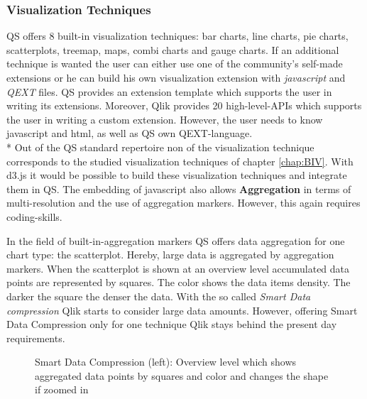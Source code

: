 \subsubsection*{Visualization Techniques}
QS offers 8 built-in visualization techniques: bar charts, line charts, pie charts, scatterplots, treemap, maps, combi charts and gauge charts. If an additional technique is wanted the user can either use one of the community's self-made extensions or he can build his own visualization extension with \textit{javascript} and \textit{QEXT} files\cite{qlikWorkbench}. QS provides an extension template which supports the user in writing its extensions. Moreover, Qlik provides 20 high-level-APIs which supports the user in writing a custom extension. However, the user needs to know javascript and html\cite{qlikVisExtensions}, as well as QS own QEXT-language. \\*
Out of the QS standard repertoire non of the visualization technique corresponds to the studied visualization techniques of chapter \ref{chap:BIV}. With d3.js it would be possible to build these visualization techniques and integrate them in QS. 
The embedding of javascript also allows \textbf{Aggregation} in terms of multi-resolution and the use of aggregation markers. However, this again requires coding-skills. 

In the field of built-in-aggregation markers QS offers data aggregation for one chart type: the scatterplot. Hereby, large data is aggregated by aggregation markers. When the scatterplot is shown at an overview level accumulated data points are represented by squares. The color shows the data items density. The darker the square the denser the data\cite{qlikScatter}. With the so called \textit{Smart Data compression} Qlik starts to consider large data amounts. However, offering Smart Data Compression only for one technique Qlik stays behind the present day requirements.


\begin{figure}[H]
    \centering
    \caption{Smart Data Compression (left): Overview level which shows aggregated data points by squares and color and changes the shape if zoomed in}
    \label{fig:smartdatacompression}
\end{figure}

